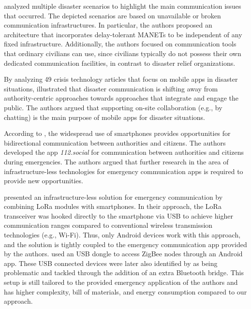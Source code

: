 \cite{lieser2017architecture} analyzed multiple disaster scenarios to highlight the main communication issues that occurred.
The depicted scenarios are based on unavailable or broken communication infrastructures.
In particular, the authors proposed an architecture that incorporates delay-tolerant MANETs to be independent of any fixed infrastructure.
Additionally, the authors focused on communication tools that ordinary civilians can use, since civilians typically do not possess their own dedicated communication facilities, in contrast to disaster relief organizations.


By analyzing 49 crisis technology articles that focus on mobile apps in disaster situations, \cite{tan2017appsCrisisInformatics} illustrated that disaster communication is shifting away from authority-centric approaches towards approaches that integrate and engage the public.
The authors argued that supporting on-site collaboration (e.g., by chatting) is the main purpose of mobile apps for disaster situations.

According to \cite{kaufhold2018socialapp}, the widespread use of smartphones provides opportunities for bidirectional communication between authorities and citizens.
The authors developed the app \emph{112.social} for communication between authorities and citizens during emergencies.
The authors argued that further research in the area of infrastructure-less technologies for emergency communication apps is required to provide new opportunities.

\cite{Sciullo2018locate} presented an infrastructure-less solution for emergency communication by combining LoRa modules with smartphones.
In their approach, the LoRa transceiver was hooked directly to the smartphone via USB to achieve higher communication ranges compared to conventional wireless transmission technologies (e.g., Wi-Fi).
Thus, only Android devices work with this approach, and the solution is tightly coupled to the emergency communication app provided by the authors. 
\cite{Olteanu2013zigbee} used an USB dongle to access ZigBee nodes through an Android app. 
These USB connected devices were later also identified by \cite{SCIULLO2020locate} as being problematic and tackled through the addition of an extra Bluetooth bridge. 
This setup is still tailored to the provided emergency application of the authors and has higher complexity, bill of materials, and energy consumption compared to our approach. 
